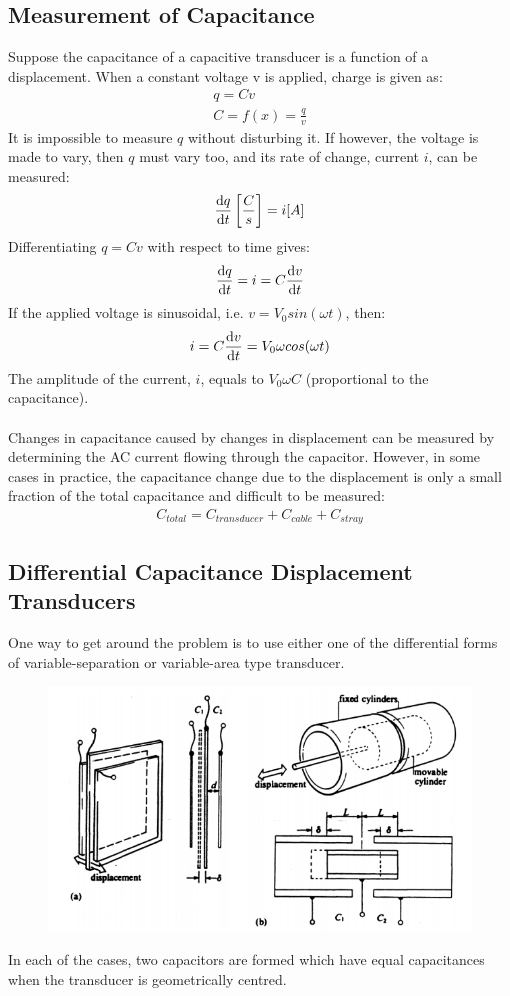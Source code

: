 \documentclass[class=report, crop=false, 12pt,a4paper]{standalone}
\begin{document}
\subsection{Measurement of Capacitance}
Suppose the capacitance of a capacitive transducer is a function of a displacement. When a constant voltage v is applied, charge is given as:
\begin{gather}
  q = Cv \\
  C = f(x) = \frac{q}{v}
\end{gather}
It is impossible to measure $q$ without disturbing it. If however, the voltage is made to vary, then $q$ must vary too, and its rate of change, current $i$, can be measured:
\begin{gather}
  \frac{\dif q}{\dif t}\left[\frac{C}{s}\right] = i[A]
\end{gather}
Differentiating $q = Cv$ with respect to time gives:
\begin{gather}
  \frac{\dif q}{\dif t} = i = C\frac{\dif v}{\dif t}
\end{gather}
If the applied voltage is sinusoidal, i.e. $v = V_0sin(\omega t)$, then:
\begin{gather}
  i = C\frac{\dif v}{\dif t} = V_0\omega cos(\omega t)
\end{gather}
The amplitude of the current, $i$, equals to $V_0\omega C$ (proportional to the capacitance). \\\\
Changes in capacitance caused by changes in displacement can be measured by determining the AC current flowing through the capacitor. However, in some cases in practice, the capacitance change due to the displacement is only a small fraction of the total capacitance and difficult to be measured:
\begin{gather}
  C_{total} = C_{transducer}+C_{cable}+C_{stray}
\end{gather}
\subsection{Differential Capacitance Displacement Transducers}
One way to get around the problem is to use either one of the differential forms of variable-separation or variable-area type transducer.
\begin{figure}[H]
  \centering
  \includegraphics[width = 0.6 \textwidth]{../img/Mdiagram4.PNG}
\end{figure}
In each of the cases, two capacitors are formed which have equal capacitances when the transducer is geometrically centred.
\end{document}
